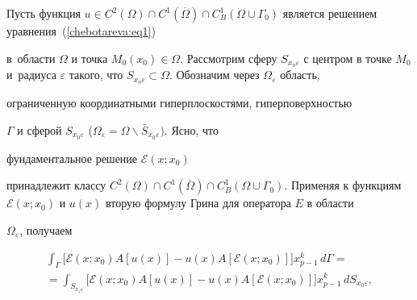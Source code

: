 

Пусть функция $u \in C^2\left( \Omega \right) \cap C^1\left(


{\overline \Omega } \right) \cap C_B^1 \left( {\Omega \cup \Gamma


_0 } \right)$ является решением уравнения~(\ref{chebotareva:eq1})


в~области $\Omega $ и точка $M_0 \left( {x_0 } \right) \in \Omega


$. Рассмотрим сферу $S_{x_o \varepsilon } $ с центром в точке $M_0


$ и~радиуса $\varepsilon $  такого,  что $S_{x_o \varepsilon }


\subset \Omega$. Обозначим через $\Omega _\varepsilon $ область, 


ограниченную координатными гиперплоскостями,  гиперповерхностью


$\Gamma $ и сферой $S_{x_0 \varepsilon } $ ($\Omega _\varepsilon =


\Omega \backslash \bar {S}_{x_0 \varepsilon } )$. Ясно,  что


фундаментальное решение $\mathcal{E}\left( {x; x_0 } \right)$


принадлежит классу $C^2\left( \Omega \right) \cap C^1\left(


{\overline \Omega } \right) \cap C_B^1 \left( {\Omega \cup \Gamma


_0 } \right)$. Применяя к функциям $\mathcal{E}\left( {x; x_0 }


\right)$ и $u(x)$ вторую формулу Грина для оператора $E$ в области


$\Omega _\varepsilon$,  получаем


\begin{multline}


\label{chebotareva:eq23}


 \int_\Gamma \bigl[ \mathcal{E}\left( {x; x_0 } \right)A\left[ {u\left( x


\right)} \right] - u\left( x \right)A\left[ \mathcal{E}\left(


{x; x_0 } \right)


\right] \bigr] x_{p - 1}^k\, d\Gamma = \\


 = \int_{S_{x_{_0 } \varepsilon } } \bigl[ \mathcal{E}\left( {x; x_0 }


\right)A\left[ u\left( x \right) \right] - u\left( x


\right)A\left[ \mathcal{E}\left( {x; x_0 } \right) \right]


\bigr] x_{p - 1}^k \,dS_{x_0 \varepsilon }, 


 \end{multline}



